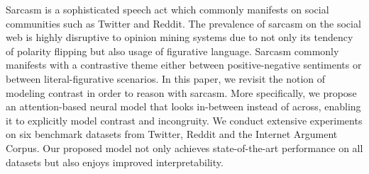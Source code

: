 Sarcasm is a sophisticated speech act which commonly manifests on social communities such as Twitter and Reddit. The prevalence of sarcasm on the social web is highly disruptive to opinion mining systems due to not only its tendency of polarity flipping but also usage of figurative language. Sarcasm commonly manifests with a contrastive theme either between positive-negative sentiments or between literal-figurative scenarios. In this paper, we revisit the notion of modeling contrast in order to reason with sarcasm. More specifically, we propose an attention-based neural model that looks in-between instead of across, enabling it to explicitly model contrast and incongruity. We conduct extensive experiments on six benchmark datasets from Twitter, Reddit and the Internet Argument Corpus. Our proposed model not only achieves state-of-the-art performance on all datasets but also enjoys improved interpretability.
